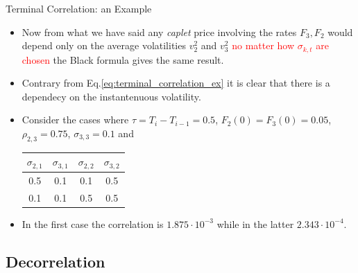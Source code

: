 \documentclass{beamer}
\begin{document}
\begin{frame}{Terminal Correlation: an Example}
\begin{itemize}
\item Now from what we have said any \emph{caplet} price involving the rates $F_3, F_2$ would depend only on the average volatilities $v_2^2$ and $v_3^2$ \textcolor{red}{no matter how $\sigma_{k,t}$ are chosen} the Black formula gives the same result.
\item Contrary from Eq.\ref{eq:terminal_correlation_ex} it is clear that there is a dependecy on the instantenuous volatility.
\item Consider the cases where $\tau=T_i - T_{i-1}=0.5$, $F_2(0)=F_3(0)=0.05$, $\rho_{2,3}=0.75$, $\sigma_{3,3}=0.1$ and
\begin{center}
\begin{tabular}{|c|c|c|c|}
\hline
$\sigma_{2,1}$ & $\sigma_{3,1}$ & $\sigma_{2,2}$ & $\sigma_{3,2}$ \\ \hline
0.5 & 0.1 & 0.1 & 0.5 \\ \hline
0.1 & 0.1 & 0.5 & 0.5 \\ \hline
\end{tabular}
\end{center}
\item In the first case the correlation is $1.875\cdot10^{-3}$ while in the latter $2.343\cdot10^{-4}$.
\end{itemize}
\end{frame}

\subsection{Decorrelation}
\end{document}
